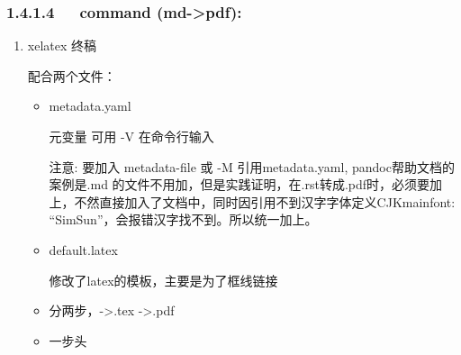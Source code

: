 \documentclass[letterpaper,12pt,english]{sphinxmanual}
\begin{document}
\subsubsection{1.4.1.4   command (md-\textgreater{}pdf):}
\label{\detokenize{001software/001install/pandoc:command-md-pdf}}\begin{enumerate}
%
\item {} 
xelatex 终稿

配合两个文件：
\begin{itemize}
\item {} 
metadata.yaml

元变量 可用 -V 在命令行输入

注意: 要加入 \textendash{}metadata-file 或 -M 引用metadata.yaml, pandoc帮助文档的案例是.md 的文件不用加，但是实践证明，在.rst转成.pdf时，必须要加上，不然直接加入了文档中，同时因引用不到汉字字体定义CJKmainfont: “SimSun”，会报错汉字找不到。所以统一加上。

\item {} 
default.latex

修改了latex的模板，主要是为了框线链接

\item {} 
分两步，-\textgreater{}.tex -\textgreater{}.pdf

\begin{sphinxVerbatim}[commandchars=\\\{\}]
   \PYGZbs{}\PYGZbs{}        \PYGZbs{}\PYGZbs{}

 
\end{sphinxVerbatim}

\item {} 
一步头


\end{itemize}
\end{enumerate}
\end{document}

